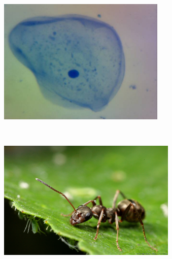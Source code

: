 \begin{figure}
 \centering
 \begin{subfigure}[b]{\textwidth}
  \begin{columns}
  \begin{column}{0.10\textwidth}
   \caption{}%
   \label{fig:cheek_cell}
  \end{column}
  \begin{column}{0.75\textwidth}
    \includegraphics[width=\textwidth]{img/cheek_cell}
  \end{column}
  \begin{column}{0.05\textwidth}
    \cite{clare_and_ben_2017}
  \end{column}
  \end{columns}
 \end{subfigure}\\
 \begin{subfigure}[b]{\textwidth}
  \begin{columns}
  \begin{column}{0.10\textwidth}
   \caption{}%
   \label{fig:ant}
  \end{column}
  \begin{column}{0.75\textwidth}
    \includegraphics[width=\textwidth]{img/ant}

\end{column}
\end{columns}
\end{subfigure}
\end{figure}
